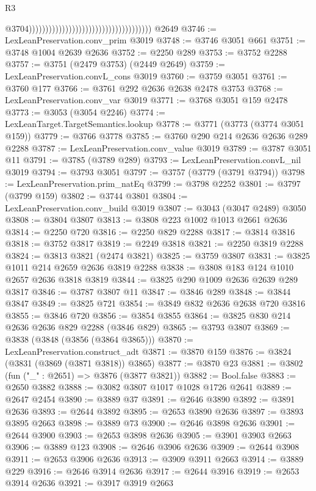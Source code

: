 \begin{lexlean}{R3}
\begin{coremodule}
                                                                              @3704)))))))))))))))))))))))))))))))))))))
    @2649
@3746 := LexLeanPreservation.conv_prim @3019
@3748 := @3746 @3051 @661
@3751 := @3748 @1004 @2639 @2636
@3752 := @2250 @289
@3753 := @3752 @2288
@3757 := @3751 (@2479 @3753) (@2449 @2649)
@3759 := LexLeanPreservation.convL_cons @3019
@3760 := @3759 @3051
@3761 := @3760 @177
@3766 := @3761 @292 @2636 @2638 @2478 @3753
@3768 := LexLeanPreservation.conv_var @3019
@3771 := @3768 @3051 @159 @2478
@3773 := @3053 (@3054 @2246)
@3774 := LexLeanTarget.TargetSemantics.lookup
@3778 := @3771 (@3773 (@3774 @3051 @159))
@3779 := @3766 @3778
@3785 := @3760 @290 @214 @2636 @2636 @289 @2288
@3787 := LexLeanPreservation.conv_value @3019
@3789 := @3787 @3051 @11
@3791 := @3785 (@3789 @289)
@3793 := LexLeanPreservation.convL_nil @3019
@3794 := @3793 @3051
@3797 := @3757 (@3779 (@3791 @3794))
@3798 := LexLeanPreservation.prim_natEq
@3799 := @3798 @2252
@3801 := @3797 (@3799 @159)
@3802 := @3744 @3801
@3804 := LexLeanPreservation.conv_build @3019
@3807 := @3043 (@3047 @2489) @3050
@3808 := @3804 @3807
@3813 := @3808 @223 @1002 @1013 @2661 @2636
@3814 := @2250 @720
@3816 := @2250 @829 @2288
@3817 := @3814 @3816
@3818 := @3752 @3817
@3819 := @2249 @3818
@3821 := @2250 @3819 @2288
@3824 := @3813 @3821 (@2474 @3821)
@3825 := @3759 @3807
@3831 := @3825 @1011 @214 @2659 @2636 @3819 @2288
@3838 := @3808 @183 @124 @1010 @2657 @2636 @3818 @3819
@3844 := @3825 @290 @1009 @2636 @2639 @289 @3817
@3846 := @3787 @3807 @11
@3847 := @3846 @289
@3848 := @3844 @3847
@3849 := @3825 @721
@3854 := @3849 @832 @2636 @2638 @720 @3816
@3855 := @3846 @720
@3856 := @3854 @3855
@3864 := @3825 @830 @214 @2636 @2636 @829 @2288 (@3846 @829)
@3865 := @3793 @3807
@3869 := @3838 (@3848 (@3856 (@3864 @3865)))
@3870 := LexLeanPreservation.construct_adt
@3871 := @3870 @159
@3876 := @3824 (@3831 (@3869 (@3871 @3818)) @3865)
@3877 := @3870 @23
@3881 := @3802 (fun ("_" : @2651) => @3876 (@3877 @3821))
@3882 := Bool.false
@3883 := @2650 @3882
@3888 := @3082 @3807 @1017 @1028 @1726 @2641
@3889 := @2647 @2454
@3890 := @3889 @37
@3891 := @2646 @3890
@3892 := @3891 @2636
@3893 := @2644 @3892
@3895 := @2653 @3890 @2636
@3897 := @3893 @3895 @2663
@3898 := @3889 @73
@3900 := @2646 @3898 @2636
@3901 := @2644 @3900
@3903 := @2653 @3898 @2636
@3905 := @3901 @3903 @2663
@3906 := @3889 @123
@3908 := @2646 @3906 @2636
@3909 := @2644 @3908
@3911 := @2653 @3906 @2636
@3913 := @3909 @3911 @2663
@3914 := @3889 @229
@3916 := @2646 @3914 @2636
@3917 := @2644 @3916
@3919 := @2653 @3914 @2636
@3921 := @3917 @3919 @2663

\end{coremodule}
\end{lexlean}
